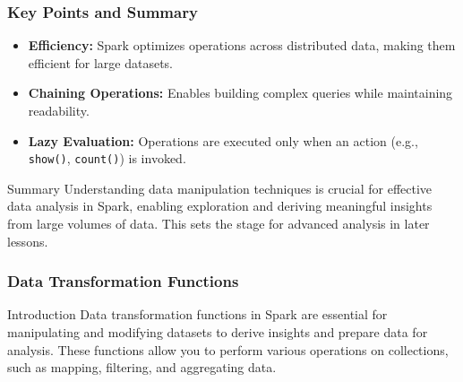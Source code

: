 \documentclass[aspectratio=169]{beamer}
\begin{document}
\begin{frame}[fragile]
    \frametitle{Key Points and Summary}
    \begin{itemize}
        \item \textbf{Efficiency:} Spark optimizes operations across distributed data, making them efficient for large datasets.
        \item \textbf{Chaining Operations:} Enables building complex queries while maintaining readability.
        \item \textbf{Lazy Evaluation:} Operations are executed only when an action (e.g., \texttt{show()}, \texttt{count()}) is invoked.
    \end{itemize}
    \begin{block}{Summary}
        Understanding data manipulation techniques is crucial for effective data analysis in Spark, 
        enabling exploration and deriving meaningful insights from large volumes of data. 
        This sets the stage for advanced analysis in later lessons.
    \end{block}
\end{frame}

\begin{frame}
    \frametitle{Data Transformation Functions}
    \begin{block}{Introduction}
        Data transformation functions in Spark are essential for manipulating and modifying datasets to derive insights and prepare data for analysis. These functions allow you to perform various operations on collections, such as mapping, filtering, and aggregating data.
    \end{block}
\end{frame}
\end{document}
